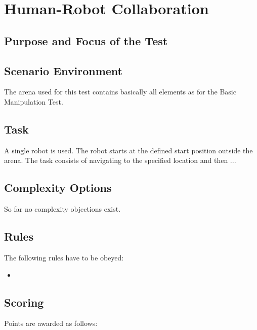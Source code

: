\newpage
\section{Human-Robot Collaboration}

\subsection{Purpose and Focus of the Test}



\subsection{Scenario Environment}
The arena used for this test contains basically all elements as for the Basic Manipulation Test.

\begin{figure}
\begin{center}
\end{center}
\end{figure}

\subsection{Task}
A single robot is used. The robot starts at the defined start position outside the arena. The task consists of navigating to the specified location and then ...


\subsection{Complexity Options}

So far no complexity objections exist.

\subsection{Rules}
The following rules have to be obeyed:

\begin{itemize}
\item
\end{itemize}


\subsection{Scoring}
Points are awarded as follows:
